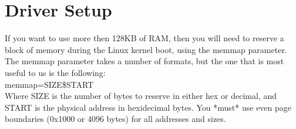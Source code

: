\section{Driver Setup}
\begin{flushleft}
If you want to use more then 128KB of RAM, then you will need to reserve a
block of memory during the Linux kernel boot, using the memmap parameter.  The
memmap parameter takes a number of formats, but the one that is most useful to
us is the following: \\
\bigskip
	memmap=SIZE\$START \\
\bigskip
Where SIZE is the number of bytes to reserve in either hex or decimal, and
START is the physical address in hexidecimal bytes.  You *must* use even
page boundaries (0x1000 or 4096 bytes) for all addresses and sizes. \\

\end{flushleft}
